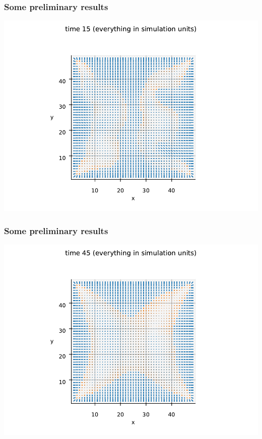 \documentclass[10pt,mathserif]{beamer}
\begin{document}
\begin{frame}
    \frametitle{Some preliminary results}
    \begin{center}
        \includegraphics[width=\textwidth]{figures/prelim2.pdf}
    \end{center}
\end{frame}

\begin{frame}
    \frametitle{Some preliminary results}
    \begin{center}
        \includegraphics[width=\textwidth]{figures/prelim3.pdf}
    \end{center}
\end{frame}
\end{document}
